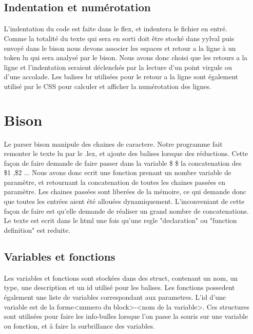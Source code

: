 \documentclass{report}
\begin{document}
{		\subsection{Indentation et numérotation}{
		\paragraph{}{
			L'indentation du code est faite dans le flex, et indentera le fichier en entré. Comme la totalité du texte qui sera en sorti doit être stocké dans yylval puis envoyé dans le bison
			nous devons associer les espaces et retour a la ligne à un token lu qui sera analysé par le bison. Nous avons donc choisi que les retours a la ligne et l'indentation seraient 
			déclenchés par la lecture d'un point virgule ou d'une accolade. Les balises br utilisées pour le retour a la ligne sont également utilisé par le CSS pour calculer et afficher la numérotation des lignes.
			}
		}
		\section{Bison}{
		\paragraph{}{
		 Le parser bison manipule des chaines de caractere. Notre programme fait remonter le texte lu par le .lex, et ajoute des balises lorsque des réductions. Cette façon de faire demande de 
		 faire passer dans la variable \$ \$ la concatenation des \$1 ,\$2 ... Nous avons donc ecrit une fonction prenant un nombre variable de paramètre, et retournant la concatenation de toutes
		 les chaines passées en paramètre. Les chaines passées sont liberées de la mémoire, ce qui demande donc que toutes les entrées aient été allouées dynamiquement.
		 L'inconveniant de cette façon de faire est qu'elle demande de réaliser un grand nombre de concatenations.
		 Le texte est ecrit dans le html une fois qu'une regle "declaration" ou "function definition" est reduite.
			}
			\subsection{Variables et fonctions}{
			\paragraph{}{
			Les variables et fonctions sont stockées dans des struct, contenant un nom, un type, une description et un id utilisé pour les balises. Les fonctions possedent également une liste 
			de variables correspondant aux parametres. L'id d'une variable est de la forme<numero du block>-<nom de la variable>.
			Ces structures sont utilisées pour faire les info-bulles lorsque l'on passe la souris sur une variable ou fonction, et à faire la surbrillance des variables.
			
}}}}
\end{document}
